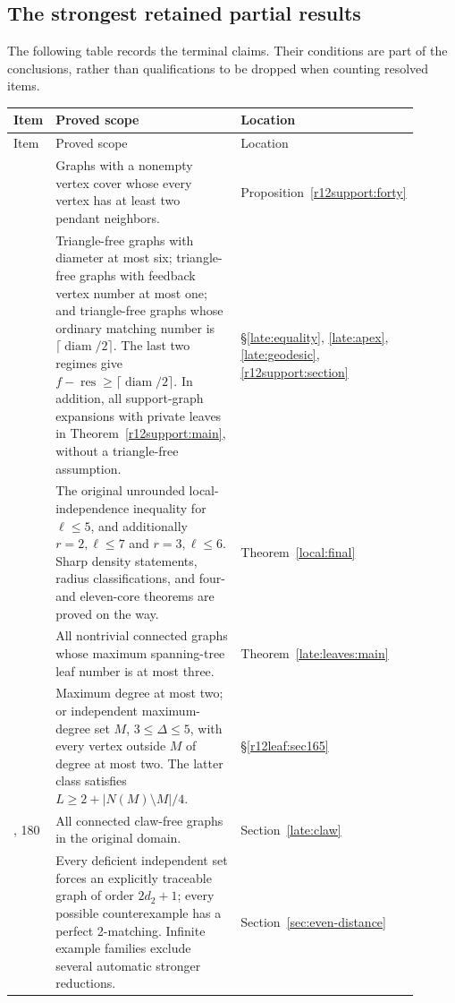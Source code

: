 \documentclass[11pt,a4paper]{article}
\theoremstyle{definition}\newtheorem{definition}[theorem]{Definition}
\theoremstyle{remark}\newtheorem{remark}[theorem]{Remark}
\newcommand{\res}{\operatorname{res}}
\newcommand{\diam}{\operatorname{diam}}
\begin{document}
\subsection{The strongest retained partial results}
The following table records the terminal claims. Their conditions are
part of the conclusions, rather than qualifications to be dropped when
counting resolved items.
\begin{longtable}{>{\raggedright\arraybackslash}p{0.075\linewidth}>{\raggedright\arraybackslash}p{0.64\linewidth}>{\raggedright\arraybackslash}p{0.19\linewidth}}
\toprule
Item&Proved scope&Location\\\midrule
\endfirsthead
\toprule Item&Proved scope&Location\\\midrule
\endhead
40&Graphs with a nonempty vertex cover whose every vertex has at least
two pendant neighbors.&Proposition~\ref{r12support:forty}\\[5pt]
61&Triangle-free graphs with diameter at most six; triangle-free
graphs with feedback vertex number at most one; and triangle-free
graphs whose ordinary matching number is $\lceil\diam/2\rceil$.
The last two regimes give $f-\res\ge\lceil\diam/2\rceil$.
In addition, all support-graph expansions with private leaves in
Theorem~\ref{r12support:main}, without a triangle-free assumption.&
\S\ref{late:equality}, \ref{late:apex}, \ref{late:geodesic},
\ref{r12support:section}\\[5pt]
133&The original unrounded local-independence inequality for
$\ell\le5$, and additionally $r=2,\ell\le7$ and $r=3,\ell\le6$.
Sharp density statements, radius classifications, and four- and
eleven-core theorems are proved on the way.&
Theorem~\ref{local:final}\\[5pt]
155&All nontrivial connected graphs whose maximum spanning-tree
leaf number is at most three.&Theorem~\ref{late:leaves:main}\\[5pt]
165&Maximum degree at most two; or independent maximum-degree set
$M$, $3\le\Delta\le5$, with every vertex outside $M$ of degree
at most two. The latter class satisfies $L\ge2+|N(M)\setminus M|/4$.&
\S\ref{r12leaf:sec165}\\[5pt]
177, 180&All connected claw-free graphs in the original domain.&
Section~\ref{late:claw}\\[5pt]
189&Every deficient independent set forces an explicitly traceable
graph of order $2d_2+1$; every possible counterexample has a perfect
2-matching. Infinite example families exclude several automatic
stronger reductions.&Section~\ref{sec:even-distance}\\[5pt]

\end{longtable}
\end{document}

